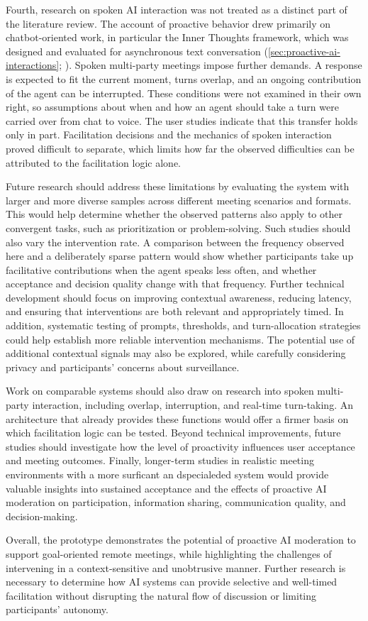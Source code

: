Fourth, research on spoken AI interaction was not treated as a distinct part of the literature review. The
account of proactive behavior drew primarily on chatbot-oriented work, in particular the Inner Thoughts
framework, which was designed and evaluated for asynchronous text conversation
(\autoref{sec:proactive-ai-interactions}; \cite{liuProactiveConversationalAgents2025}). Spoken multi-party
meetings impose further demands. A response is expected to fit the current moment, turns overlap, and an
ongoing contribution of the agent can be interrupted. These conditions were not examined in their own right,
so assumptions about when and how an agent should take a turn were carried over from chat to voice. The user
studies indicate that this transfer holds only in part. Facilitation decisions and the mechanics of spoken
interaction proved difficult to separate, which limits how far the observed difficulties can be attributed
to the facilitation logic alone.

Future research should address these limitations by evaluating the system with larger and more diverse
samples across different meeting scenarios and formats. This would help determine whether the observed
patterns also apply to other convergent tasks, such as prioritization or problem-solving. Such studies
should also vary the intervention rate. A comparison between the frequency observed here and a deliberately
sparse pattern would show whether participants take up facilitative contributions when the agent speaks less
often, and whether acceptance and decision quality change with that frequency. Further technical development
should focus on improving contextual awareness, reducing latency, and ensuring that interventions are both
relevant and appropriately timed. In addition, systematic testing of prompts, thresholds, and turn-allocation
strategies could help establish more reliable intervention mechanisms. The potential use of additional
contextual signals may also be explored, while carefully considering privacy and participants' concerns about
surveillance.

Work on comparable systems should also draw on research into spoken multi-party interaction, including
overlap, interruption, and real-time turn-taking. An architecture that already provides these functions
would offer a firmer basis on which facilitation logic can be tested. Beyond technical improvements, future
studies should investigate how the level of proactivity influences user acceptance and meeting outcomes.
Finally, longer-term studies in realistic meeting environments with a more surficant an dspecialeded system would
provide valuable insights into sustained acceptance and the effects of proactive AI moderation on
participation, information sharing, communication quality, and decision-making.

Overall, the prototype demonstrates the potential of proactive AI moderation to support goal-oriented remote
meetings, while highlighting the challenges of intervening in a context-sensitive and unobtrusive manner.
Further research is necessary to determine how AI systems can provide selective and well-timed facilitation
without disrupting the natural flow of discussion or limiting participants' autonomy.
